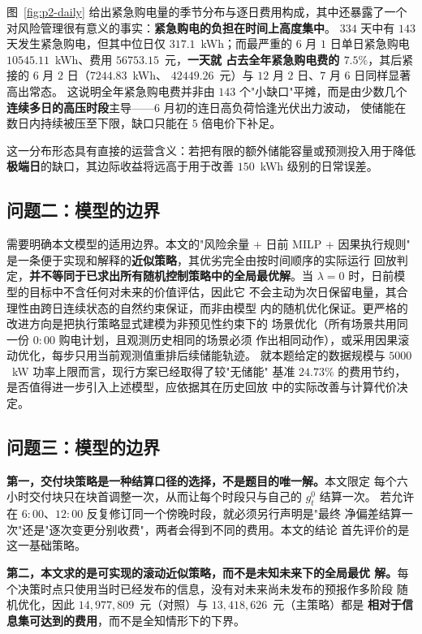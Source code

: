 图~\ref{fig:p2-daily} 给出紧急购电量的季节分布与逐日费用构成，其中还暴露了一个
对风险管理很有意义的事实：\textbf{紧急购电的负担在时间上高度集中}。
$334$ 天中有 $143$ 天发生紧急购电，但其中位日仅 $317.1$~kWh；而最严重的
$6$ 月 $1$ 日单日紧急购电 $10545.11$~kWh、费用 $56753.15$~元，\textbf{一天就
占去全年紧急购电费的 $7.5\%$}，其后紧接的 $6$ 月 $2$ 日（$7244.83$~kWh、
$42449.26$~元）与 $12$ 月 $2$ 日、$7$ 月 $6$ 日同样显著高出常态。
这说明全年紧急购电费并非由 $143$ 个"小缺口"平摊，而是由少数几个
\textbf{连续多日的高压时段}主导——$6$ 月初的连日高负荷恰逢光伏出力波动，
使储能在数日内持续被压至下限，缺口只能在 $5$ 倍电价下补足。

这一分布形态具有直接的运营含义：若把有限的额外储能容量或预测投入用于降低
\textbf{极端日}的缺口，其边际收益将远高于用于改善 $150$~kWh 级别的日常误差。

\subsection{问题二：模型的边界}

需要明确本文模型的适用边界。本文的"风险余量 + 日前 MILP + 因果执行规则"
是一条便于实现和解释的\textbf{近似策略}，其优劣完全由按时间顺序的实际运行
回放判定，\textbf{并不等同于已求出所有随机控制策略中的全局最优解}。当
$\lambda=0$ 时，日前模型的目标中不含任何对未来的价值评估，因此它\textbf{}
不会主动为次日保留电量，其合理性由跨日连续状态的自然约束保证，而非由模型
内的随机优化保证。更严格的改进方向是把执行策略显式建模为非预见性约束下的
场景优化（所有场景共用同一份 $0{:}00$ 购电计划，且观测历史相同的场景必须
作出相同动作），或采用因果滚动优化，每步只用当前观测值重排后续储能轨迹。
就本题给定的数据规模与 $5000$~kW 功率上限而言，现行方案已经取得了较"无储能"
基准 $24.73\%$ 的费用节约，是否值得进一步引入上述模型，应依据其在历史回放
中的实际改善与计算代价决定。

\subsection{问题三：模型的边界}

\textbf{第一，交付块策略是一种结算口径的选择，不是题目的唯一解。}本文限定
每个六小时交付块只在块首调整一次，从而让每个时段只与自己的 $g_t^0$ 结算一次。
若允许在 $6{:}00$、$12{:}00$ 反复修订同一个傍晚时段，就必须另行声明是"最终
净偏差结算一次"还是"逐次变更分别收费"，两者会得到不同的费用。本文的结论
首先评价的是这一基础策略。

\textbf{第二，本文求的是可实现的滚动近似策略，而不是未知未来下的全局最优
解。}每个决策时点只使用当时已经发布的信息，没有对未来尚未发布的预报作多阶段
随机优化，因此 $14{,}977{,}809$~元（对照）与 $13{,}418{,}626$~元（主策略）都是
\textbf{相对于信息集可达到的费用}，而不是全知情形下的下界。


